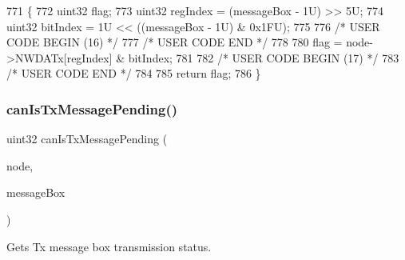 \begin{DoxyCode}
771 \{
772     uint32 flag;
773     uint32 regIndex = (messageBox - 1U) >> 5U;
774     uint32 bitIndex = 1U << ((messageBox - 1U) & 0x1FU);
775 
776 \textcolor{comment}{/* USER CODE BEGIN (16) */}
777 \textcolor{comment}{/* USER CODE END */}
778 
780     flag = node->NWDATx[regIndex] & bitIndex;
781 
782 \textcolor{comment}{/* USER CODE BEGIN (17) */}
783 \textcolor{comment}{/* USER CODE END */}
784 
785     \textcolor{keywordflow}{return} flag;
786 \}
\end{DoxyCode}
\mbox{\label{group__CAN_ga90c2fd9d51bca56e652da71570099295}} 
\subsubsection{\texorpdfstring{can\+Is\+Tx\+Message\+Pending()}{canIsTxMessagePending()}}
{\footnotesize\ttfamily uint32 can\+Is\+Tx\+Message\+Pending (\begin{DoxyParamCaption}\item[{\mbox{\hyperlink{reg__can_8h_a54ace0879c28a425474845a63d662c05}{can\+B\+A\+S\+E\+\_\+t}} $\ast$}]{node,  }\item[{uint32}]{message\+Box }\end{DoxyParamCaption})}



Gets Tx message box transmission status. 



